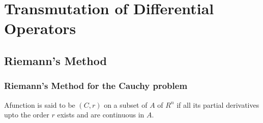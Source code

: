 
\part{Transmutation of Differential Operators}\label{part1} %

\chapter{Riemann's Method}\label{part1:chap1} %

\section{Riemann's Method for the Cauchy problem}\label{part1:chap1:sec1}

\begin{defi*}
  A\pageoriginale function is said to be $(C,r)$ on a subset of $A$ of $R^n$ if all
  its partial derivatives upto the order $r$ exists and are continuous
  in $A$. 
\end{defi*}

